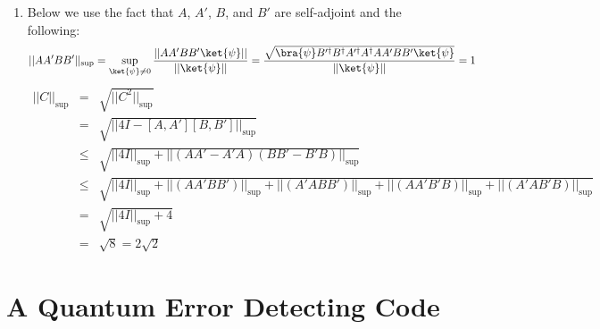 \documentclass[12pt]{article}
\begin{document}
\begin{enumerate}
\item %
Below we use the fact that $A$, $A'$, $B$, and $B'$ are self-adjoint and the
following:
%
\begin{displaymath}
||AA'BB'||_{\textrm{sup}} = \sup_{\ket{\psi}\ne 0} \frac{||AA'BB'\ket{\psi}||}{||\ket{\psi}||} = \frac{\sqrt{\bra{\psi}B'^\dagger B^\dagger A'^\dagger A^\dagger AA'BB'\ket{\psi}}}{||\ket{\psi}||} = 1
\end{displaymath}
%
\begin{eqnarray*}
||C||_{\textrm{sup}} & = & \sqrt{||C^2||_{\textrm{sup}}}\\
& = & \sqrt{||4I - [A,A'][B,B']||_{\textrm{sup}}}\\
& \le & \sqrt{||4I||_{\textrm{sup}} + ||(AA'-A'A)(BB'-B'B)||_{\textrm{sup}}}\\
& \le & \sqrt{||4I||_{\textrm{sup}} + ||(AA'BB')||_{\textrm{sup}} + ||(A'ABB')||_{\textrm{sup}} + ||(AA'B'B)||_{\textrm{sup}} + ||(A'AB'B)||_{\textrm{sup}}}\\
& = & \sqrt{||4I||_{\textrm{sup}} + 4}\\
& = & \sqrt{8} = 2\sqrt{2}
\end{eqnarray*}

\end{enumerate}

\pagebreak

\section{A Quantum Error Detecting Code}
\end{document}

